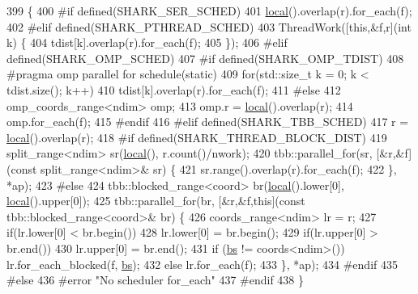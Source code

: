 \begin{DoxyCode}
399                                                                              \{
400 \textcolor{preprocessor}{#if defined(SHARK\_SER\_SCHED)}
401             \hyperlink{classshark_1_1ndim_1_1_domain_a3351db56f9d6bd22ba473d744e3f7025}{local}().overlap(r).for\_each(f);
402 \textcolor{preprocessor}{#elif defined(SHARK\_PTHREAD\_SCHED)}
403             ThreadWork([\textcolor{keyword}{this},&f,r](\textcolor{keywordtype}{int} k) \{
404                 tdist[k].overlap(r).for\_each(f);
405             \});
406 \textcolor{preprocessor}{#elif defined(SHARK\_OMP\_SCHED)}
407 \textcolor{preprocessor}{#if defined(SHARK\_OMP\_TDIST)}
408 \textcolor{preprocessor}{#pragma omp parallel for schedule(static)}
409             \textcolor{keywordflow}{for}(std::size\_t k = 0; k < tdist.size(); k++)
410                 tdist[k].overlap(r).for\_each(f);
411 \textcolor{preprocessor}{#else}
412             omp\_coords\_range<ndim> omp;
413             omp.r = \hyperlink{classshark_1_1ndim_1_1_domain_a3351db56f9d6bd22ba473d744e3f7025}{local}().overlap(r);
414             omp.for\_each(f);
415 \textcolor{preprocessor}{#endif}
416 \textcolor{preprocessor}{#elif defined(SHARK\_TBB\_SCHED)}
417             r = \hyperlink{classshark_1_1ndim_1_1_domain_a3351db56f9d6bd22ba473d744e3f7025}{local}().overlap(r);
418 \textcolor{preprocessor}{#if defined(SHARK\_THREAD\_BLOCK\_DIST)}
419             split\_range<ndim> sr(\hyperlink{classshark_1_1ndim_1_1_domain_a3351db56f9d6bd22ba473d744e3f7025}{local}(), r.count()/nwork);
420             tbb::parallel\_for(sr, [&r,&f](\textcolor{keyword}{const} split\_range<ndim>& sr) \{
421                 sr.range().overlap(r).for\_each(f);
422             \}, *ap);
423 \textcolor{preprocessor}{#else}
424             tbb::blocked\_range<coord> br(\hyperlink{classshark_1_1ndim_1_1_domain_a3351db56f9d6bd22ba473d744e3f7025}{local}().lower[0], \hyperlink{classshark_1_1ndim_1_1_domain_a3351db56f9d6bd22ba473d744e3f7025}{local}().upper[0]);
425             tbb::parallel\_for(br, [&r,&f,\textcolor{keyword}{this}](\textcolor{keyword}{const} tbb::blocked\_range<coord>& br) \{
426                 coords\_range<ndim> lr = r;
427                 \textcolor{keywordflow}{if}(lr.lower[0] < br.begin())
428                     lr.lower[0] = br.begin();
429                 \textcolor{keywordflow}{if}(lr.upper[0] > br.end())
430                     lr.upper[0] = br.end();
431                                 \textcolor{keywordflow}{if} (\hyperlink{classshark_1_1ndim_1_1_domain_a2be17b3d153f7fbbede6eec0afd17ebe}{bs} != coords<ndim>()) lr.for\_each\_blocked(f, 
      \hyperlink{classshark_1_1ndim_1_1_domain_a2be17b3d153f7fbbede6eec0afd17ebe}{bs});
432                                 \textcolor{keywordflow}{else}                      lr.for\_each(f);
433             \}, *ap);
434 \textcolor{preprocessor}{#endif}
435 \textcolor{preprocessor}{#else}
436 \textcolor{preprocessor}{#error "No scheduler for\_each"}
437 \textcolor{preprocessor}{#endif}
438         \}
\end{DoxyCode}
